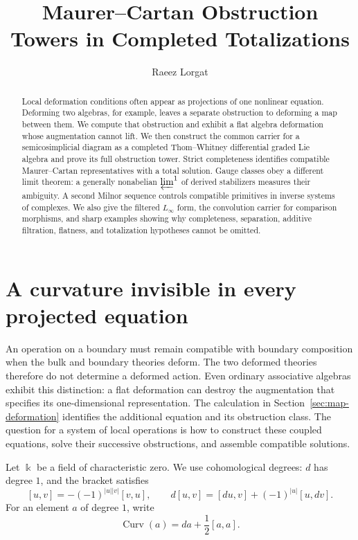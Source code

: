 \documentclass[11pt]{article}
\title{Maurer--Cartan Obstruction Towers in Completed Totalizations}
\author{Raeez Lorgat}
\date{}
\theoremstyle{definition}
\theoremstyle{remark}
\newcommand{\Curv}{\operatorname{Curv}}
\begin{document}
\maketitle

\begin{abstract}
Local deformation conditions often appear as projections of one nonlinear
equation.  Deforming two algebras, for example, leaves a separate obstruction
to deforming a map between them.  We compute that obstruction and exhibit
a flat algebra deformation whose augmentation cannot lift.  We then
construct the common carrier for a semicosimplicial diagram as a completed
Thom--Whitney differential graded Lie algebra and prove its full obstruction
tower.  Strict completeness identifies compatible Maurer--Cartan
representatives with a total solution.  Gauge classes obey a different limit
theorem: a generally nonabelian $\varprojlim^1$ of derived stabilizers measures
their ambiguity.  A second Milnor sequence controls compatible primitives in
inverse systems of complexes.  We also give the filtered $L_\infty$ form, the
convolution carrier for comparison morphisms, and sharp examples showing why
completeness, separation, additive filtration, flatness, and totalization
hypotheses cannot be omitted.
\end{abstract}

\section{A curvature invisible in every projected equation}

An operation on a boundary must remain compatible with boundary composition
when the bulk and boundary theories deform.  The two deformed theories
therefore do not determine a deformed action.  Even ordinary associative
algebras exhibit this distinction: a flat deformation can destroy the
augmentation that specifies its one-dimensional representation.
The calculation in Section~\ref{sec:map-deformation} identifies the additional
equation and its obstruction class.  The question for a system of local
operations is how to construct these coupled equations, solve their
successive obstructions, and assemble compatible solutions.

Let $\Bbbk$ be a field of characteristic zero.  We use cohomological degrees:
$d$ has degree $1$, and the bracket satisfies
\[
 [u,v]=-(-1)^{|u||v|}[v,u],
 \qquad
 d[u,v]=[du,v]+(-1)^{|u|}[u,dv].
\]
For an element $a$ of degree $1$, write
\[
 \Curv(a)=da+\frac12[a,a].
\]
\end{document}
